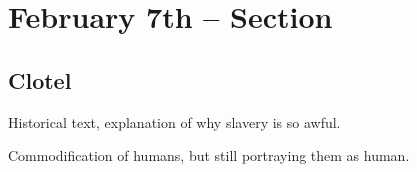 \section{February 7th -- Section}

\subsection{Clotel}

Historical text, explanation of why slavery is so awful.

Commodification of humans, but still portraying them as human.